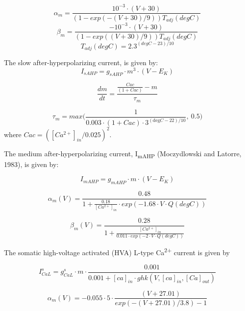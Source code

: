 \documentclass[12pt]{article}
\begin{document}
\begin{equation}
\alpha_m =  \frac{10^{-3}\cdot(V+30)}{(1-exp(-(V+30)/9))T_{adj}(degC)} 
\end{equation}
\begin{equation}
\beta_m = \frac{ -10^{-3}\cdot(V+30)}{(1-exp((V+30)/9))T_{adj}(degC)}
\end{equation}
\begin{equation}
T_{adj}(degC)=2.3^{(degC-23)/10}
\end{equation}


The slow after-hyperpolarizing current, is given by:
\begin{equation}
I_{sAHP}= g_{sAHP} \cdot m^3 \cdot (V-E_K)
\end{equation}

\begin{equation}
\frac{dm}{dt}=\frac{\frac{Cac}{(1+Cac)}-m}{\tau_m}
\end{equation}

\begin{equation}
\tau_m=max \Big(\frac {1}{0.003 \cdot (1+Cac)\cdot 3^{(\text{deg}C-22)/10}}, \ 0.5 \Big)
\end{equation}
where 
$Cac=([Ca^{2+}]_{in}/0.025)^2$.

The medium after-hyperpolarizing current, I\textsubscript{mAHP} (Moczydlowski and Latorre, 1983), is given by:

\begin{equation}
I_{mAHP}= g_{mAHP}\cdot m\cdot (V-E_K)
\end{equation}

\begin{equation}
\alpha_m(V)=\frac{0.48}{1+\frac{0.18}{[Ca^{2+}]_{in}}\cdot
	exp(-1.68\cdot V\cdot Q(degC))}
\end{equation}

\begin{equation}
\beta_m(V)=\frac{0.28}{1+\frac{[Ca^{2+}]_{in}}{0.011\cdot
		exp(-2\cdot V\cdot Q(degC))}}
\end{equation}

The somatic high-voltage activated (HVA) L-type Ca\textsuperscript{2+} current is given by


\begin{equation}
I_{CaL}^s= g_{CaL}^s\cdot m\cdot \frac{0.001 }{0.001 + [ca]_{in}\cdot ghk(V, [ca]_{in}, [Ca]_{out})}
\end{equation}

\begin{equation}
\alpha_m(V)=-0.055 \cdot 5 \cdot \frac{(V+27.01)}{exp(-(V+27.01)/3.8)-1}
\end{equation}
\end{document}
